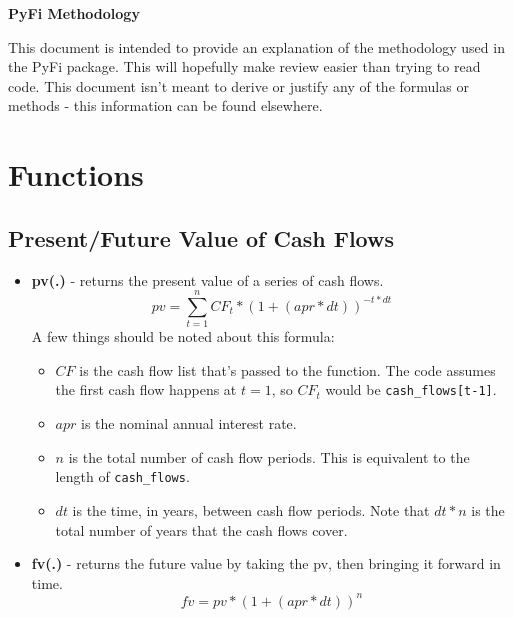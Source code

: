 \documentclass[10pt]{article}
\begin{document}
\begin{center}
    {\bfseries\Huge PyFi Methodology}\\[20pt]
\end{center}

\begin{flushleft}
    This document is intended to provide an explanation of the methodology used in the PyFi package.
    This will hopefully make review easier than trying to read code. This document isn't meant to
    derive or justify any of the formulas or methods - this information can be found elsewhere.
\end{flushleft}

\section{Functions}
\subsection*{Present/Future Value of Cash Flows}
\begin{itemize}
\item \textbf{pv(.)} - returns the present value of a series of cash flows.\\
    \begin{equation}
        pv = \sum_{t=1}^n CF_t * (1 + (apr*dt))^{-t*dt}
    \end{equation}
    A few things should be noted about this formula:
    \begin{itemize}
    \item $CF$ is the cash flow list that's passed to the function. The code assumes the first cash flow
        happens at $t=1$, so $CF_t$ would be \texttt{cash\_flows[t-1]}.
    \item $apr$ is the nominal annual interest rate.
    \item $n$ is the total number of cash flow periods. This is equivalent to the length of 
        \texttt{cash\_flows}.
    \item $dt$ is the time, in years, between cash flow periods. Note that $dt*n$ is the total number
        of years that the cash flows cover.
    \end{itemize}
\item \textbf{fv(.)} - returns the future value by taking the pv, then bringing it forward in time.\\
    \begin{equation}
        fv = pv*(1 + (apr*dt))^{n}
    \end{equation}
\end{itemize}
\end{document}
